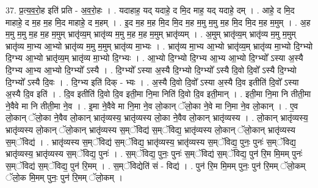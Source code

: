 \documentclass[17pt]{extarticle}
\begin{document}
37. प्र॒त्य॒व॒रो॒ह इति॑ प्रति - अ॒व॒रो॒हः । . यदाहाह॒ यद् यदाहे॒ द मि॒द माह॒ यद् यदाहे॒ दम् । . आहे॒ द मि॒द माहाहे॒ द म॒ह म॒ह मि॒द माहाहे॒ द म॒हम् । . इ॒द म॒ह म॒ह मि॒द मि॒द म॒ह म॒मु म॒मु म॒ह मि॒द मि॒द म॒ह म॒मुम् । . अ॒ह म॒मु म॒मु म॒ह म॒ह म॒मुम् भ्रातृ॑व्य॒म् भ्रातृ॑व्य म॒मु म॒ह म॒ह म॒मुम् भ्रातृ॑व्यम् । . अ॒मुम् भ्रातृ॑व्य॒म् भ्रातृ॑व्य म॒मु म॒मुम् भ्रातृ॑व्य मा॒भ्य आ॒भ्यो भ्रातृ॑व्य म॒मु म॒मुम् भ्रातृ॑व्य मा॒भ्यः । . भ्रातृ॑व्य मा॒भ्य आ॒भ्यो भ्रातृ॑व्य॒म् भ्रातृ॑व्य मा॒भ्यो दि॒ग्भ्यो दि॒ग्भ्य आ॒भ्यो भ्रातृ॑व्य॒म् भ्रातृ॑व्य मा॒भ्यो दि॒ग्भ्यः । . आ॒भ्यो दि॒ग्भ्यो दि॒ग्भ्य आ॒भ्य आ॒भ्यो दि॒ग्भ्यो᳚ ऽस्या अ॒स्यै दि॒ग्भ्य आ॒भ्य आ॒भ्यो दि॒ग्भ्यो᳚ ऽस्यै । . दि॒ग्भ्यो᳚ ऽस्या अ॒स्यै दि॒ग्भ्यो दि॒ग्भ्यो᳚ ऽस्यै दि॒वो दि॒वो᳚ ऽस्यै दि॒ग्भ्यो दि॒ग्भ्यो᳚ ऽस्यै दि॒वः । . दि॒ग्भ्य इति॑ दिक् - भ्यः । . अ॒स्यै दि॒वो दि॒वो᳚ ऽस्या अ॒स्यै दि॒व इतीति॑ दि॒वो᳚ ऽस्या अ॒स्यै दि॒व इति॑ । . दि॒व इतीति॑ दि॒वो दि॒व इती॒मा नि॒मा निति॑ दि॒वो दि॒व इती॒मान् । . इती॒मा नि॒मा नि तीती॒मा ने॒वैवे मा नि तीती॒मा ने॒व । . इ॒मा ने॒वैवे मा नि॒मा ने॒व लो॒कान् ॅलो॒का ने॒वे मा नि॒मा ने॒व लो॒कान् । . ए॒व लो॒कान् ॅलो॒का ने॒वैव लो॒कान् भ्रातृ॑व्यस्य॒ भ्रातृ॑व्यस्य लो॒का ने॒वैव लो॒कान् भ्रातृ॑व्यस्य । . लो॒कान् भ्रातृ॑व्यस्य॒ भ्रातृ॑व्यस्य लो॒कान् ॅलो॒कान् भ्रातृ॑व्यस्य स॒म्ॅविद्य॑ स॒म्ॅविद्य॒ भ्रातृ॑व्यस्य लो॒कान् ॅलो॒कान् भ्रातृ॑व्यस्य स॒म्ॅविद्य॑ । . भ्रातृ॑व्यस्य स॒म्ॅविद्य॑ स॒म्ॅविद्य॒ भ्रातृ॑व्यस्य॒ भ्रातृ॑व्यस्य स॒म्ॅविद्य॒ पुनः॒ पुनः॑ स॒म्ॅविद्य॒ भ्रातृ॑व्यस्य॒ भ्रातृ॑व्यस्य स॒म्ॅविद्य॒ पुनः॑ । . स॒म्ॅविद्य॒ पुनः॒ पुनः॑ स॒म्ॅविद्य॑ स॒म्ॅविद्य॒ पुन॑ रि॒म मि॒मम् पुनः॑ स॒म्ॅविद्य॑ स॒म्ॅविद्य॒ पुन॑ रि॒मम् । . स॒म्ॅविद्येति॑ सं - विद्य॑ । . पुन॑ रि॒म मि॒मम् पुनः॒ पुन॑ रि॒मम् ॅलो॒कम् ॅलो॒क मि॒मम् पुनः॒ पुन॑ रि॒मम् ॅलो॒कम् । \newline
\end{document}

